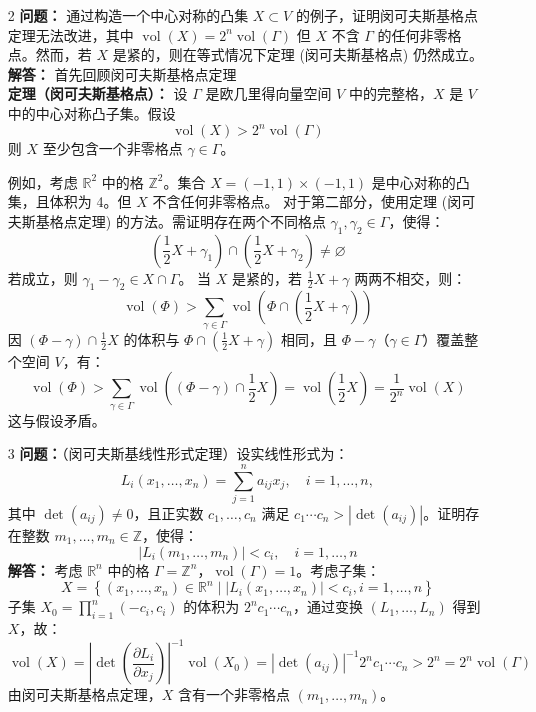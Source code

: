 \documentclass[UTF8]{ctexart}
\begin{document}
\begin{enumerate}
\begin{enumerate}
\item[2] 
\textbf{问题：} 通过构造一个中心对称的凸集 \(X \subset V\) 的例子，证明闵可夫斯基格点定理无法改进，其中 \(\operatorname{vol}(X) = 2^n \operatorname{vol}(\Gamma)\) 但 \(X\) 不含 \(\Gamma\) 的任何非零格点。然而，若 \(X\) 是紧的，则在等式情况下定理 (闵可夫斯基格点) 仍然成立。\\
\textbf{解答：} 
首先回顾闵可夫斯基格点定理\\
\textbf{ 定理（闵可夫斯基格点）：} 设 $\Gamma$ 是欧几里得向量空间 $V$ 中的完整格，$X$ 是 $V$ 中的中心对称凸子集。假设
$$
\operatorname{vol}(X)>2^n \operatorname{vol}(\Gamma)
$$
则 $X$ 至少包含一个非零格点 $\gamma \in \Gamma$。

例如，考虑 \(\mathbb{R}^2\) 中的格 \(\mathbb{Z}^2\)。集合 \(X = (-1, 1) \times (-1, 1)\) 是中心对称的凸集，且体积为 4。但 \(X\) 不含任何非零格点。  
对于第二部分，使用定理 (闵可夫斯基格点定理) 的方法。需证明存在两个不同格点 \(\gamma_1, \gamma_2 \in \Gamma\)，使得：
\[
\left(\frac{1}{2} X + \gamma_1\right) \cap \left(\frac{1}{2} X + \gamma_2\right) \neq \varnothing
\]
若成立，则 \(\gamma_1 - \gamma_2 \in X \cap \Gamma\)。  
当 \(X\) 是紧的，若 \(\frac{1}{2} X + \gamma\) 两两不相交，则：
\[
\operatorname{vol}(\Phi) > \sum_{\gamma \in \Gamma} \operatorname{vol}\left(\Phi \cap \left(\frac{1}{2} X + \gamma\right)\right)
\]
因 \((\Phi - \gamma) \cap \frac{1}{2} X\) 的体积与 \(\Phi \cap \left(\frac{1}{2} X + \gamma\right)\) 相同，且 \(\Phi - \gamma\)（\(\gamma \in \Gamma\)）覆盖整个空间 \(V\)，有：
\[
\operatorname{vol}(\Phi) > \sum_{\gamma \in \Gamma} \operatorname{vol}\left((\Phi - \gamma) \cap \frac{1}{2} X\right) = \operatorname{vol}\left(\frac{1}{2} X\right) = \frac{1}{2^n} \operatorname{vol}(X)
\]
这与假设矛盾。

\item[3] 
\textbf{问题：}（闵可夫斯基线性形式定理）设实线性形式为：
\[
L_i(x_1, \dots, x_n) = \sum_{j=1}^n a_{ij} x_j, \quad i = 1, \dots, n,
\]
其中 \(\operatorname{det}(a_{ij}) \neq 0\)，且正实数 \(c_1, \dots, c_n\) 满足 \(c_1 \cdots c_n > |\operatorname{det}(a_{ij})|\)。证明存在整数 \(m_1, \dots, m_n \in \mathbb{Z}\)，使得：
\[
|L_i(m_1, \dots, m_n)| < c_i, \quad i = 1, \dots, n
\]
\textbf{解答：} 考虑 \(\mathbb{R}^n\) 中的格 \(\Gamma = \mathbb{Z}^n\)，\(\operatorname{vol}(\Gamma) = 1\)。考虑子集：
\[
X = \left\{(x_1, \dots, x_n) \in \mathbb{R}^n \mid |L_i(x_1, \dots, x_n)| < c_i, i = 1, \dots, n\right\}
\]
子集 \(X_0 = \prod_{i=1}^n (-c_i, c_i)\) 的体积为 \(2^n c_1 \cdots c_n\)，通过变换 \((L_1, \dots, L_n)\) 得到 \(X\)，故：
\[
\operatorname{vol}(X) = |\operatorname{det}(\frac{\partial L_i}{\partial x_j})|^{-1} \operatorname{vol}(X_0) = |\operatorname{det}(a_{ij})|^{-1} 2^n c_1 \cdots c_n > 2^n = 2^n \operatorname{vol}(\Gamma)
\]
由闵可夫斯基格点定理，\(X\) 含有一个非零格点 \((m_1, \dots, m_n)\)。


\end{enumerate}
\end{enumerate}
\end{document}
